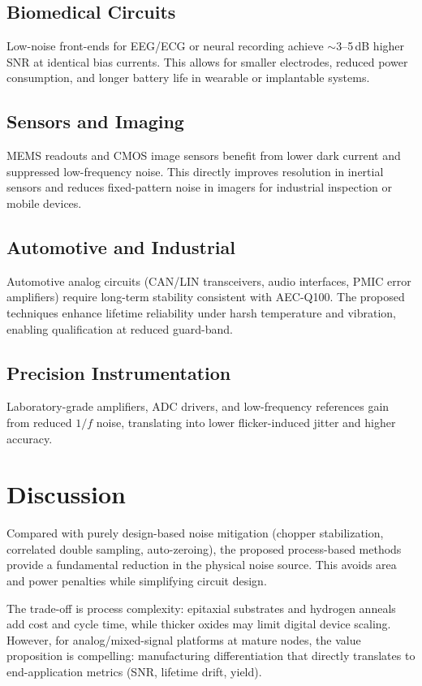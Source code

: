 \documentclass[conference]{IEEEtran}
\begin{document}
\subsection{Biomedical Circuits}
Low-noise front-ends for EEG/ECG or neural recording achieve $\sim$3--5\,dB higher SNR at identical bias currents. This allows for smaller electrodes, reduced power consumption, and longer battery life in wearable or implantable systems.

\subsection{Sensors and Imaging}
MEMS readouts and CMOS image sensors benefit from lower dark current and suppressed low-frequency noise. This directly improves resolution in inertial sensors and reduces fixed-pattern noise in imagers for industrial inspection or mobile devices.

\subsection{Automotive and Industrial}
Automotive analog circuits (CAN/LIN transceivers, audio interfaces, PMIC error amplifiers) require long-term stability consistent with AEC-Q100. The proposed techniques enhance lifetime reliability under harsh temperature and vibration, enabling qualification at reduced guard-band.

\subsection{Precision Instrumentation}
Laboratory-grade amplifiers, ADC drivers, and low-frequency references gain from reduced $1/f$ noise, translating into lower flicker-induced jitter and higher accuracy.

\section{Discussion}
Compared with purely design-based noise mitigation (chopper stabilization, correlated double sampling, auto-zeroing), the proposed process-based methods provide a fundamental reduction in the physical noise source. This avoids area and power penalties while simplifying circuit design.

The trade-off is process complexity: epitaxial substrates and hydrogen anneals add cost and cycle time, while thicker oxides may limit digital device scaling. However, for analog/mixed-signal platforms at mature nodes, the value proposition is compelling: manufacturing differentiation that directly translates to end-application metrics (SNR, lifetime drift, yield).
\end{document}
